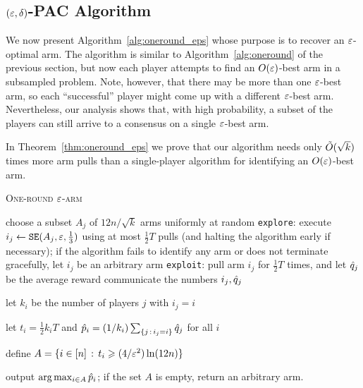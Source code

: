 \subsection{$(\varepsilon,\delta)$-PAC Algorithm} \label{sec:oneround_eps}

We now present Algorithm~\ref{alg:oneround_eps} whose purpose is to recover an $\varepsilon$-optimal arm.
The algorithm is similar to Algorithm~\ref{alg:oneround} of the previous section, but now each player attempts to find an $O(\varepsilon)$-best arm in a subsampled problem. 
Note, however, that there may be more than one $\varepsilon$-best arm, so each
``successful'' player might come up with a different $\varepsilon$-best
arm.
Nevertheless, our analysis shows that, with high probability, a subset of
the players can still arrive to a consensus on a single $\varepsilon$-best arm. 


In Theorem~\ref{thm:oneround_eps} we prove that our algorithm needs only
$\tilde{O}(\sqrt{k})$ times more arm pulls than a single-player algorithm for
identifying an $O(\varepsilon)$-best arm.



\begin{algorithm} \caption{\textsc{One-round $\varepsilon$-arm}} \label{alg:oneround_eps}
\begin{algorithmic}[1]


	\STATE choose a subset $A_j$ of $12n/\sqrt{k}$ arms uniformly at random
	\STATE \texttt{explore}: execute $i_j \gets \texttt{SE}(A_j,\varepsilon,\tfrac{1}{3})$ using at most $\tfrac{1}{2}T$ pulls (and halting the algorithm early if necessary); if the algorithm fails to identify any arm or does not terminate gracefully, let $i_j$ be an arbitrary arm
	\STATE \texttt{exploit}: pull arm $i_j$ for $\tfrac{1}{2}T$ times, and let $\hat{q}_j$ be the average reward
	\STATE communicate the numbers $i_j, \hat{q}_j$
\ENDFOR

\STATE let $k_i$ be the number of players $j$ with $i_j = i$

\STATE let $t_i = \tfrac{1}{2} k_i T$ and 
$\hat{p}_i = (1/k_i) \sum_{\{j \,:\, i_j = i\}} \hat{q}_j$ for all $i$

\STATE define $A = \{i \in [n] \,:\, t_i \geqslant (4/\varepsilon^2) \ln (12n)\}$

\STATE output $\arg \max_{i \in A} \hat{p}_i$; if the set $A$ is empty, return an arbitrary arm. 
\end{algorithmic}
\end{algorithm}

